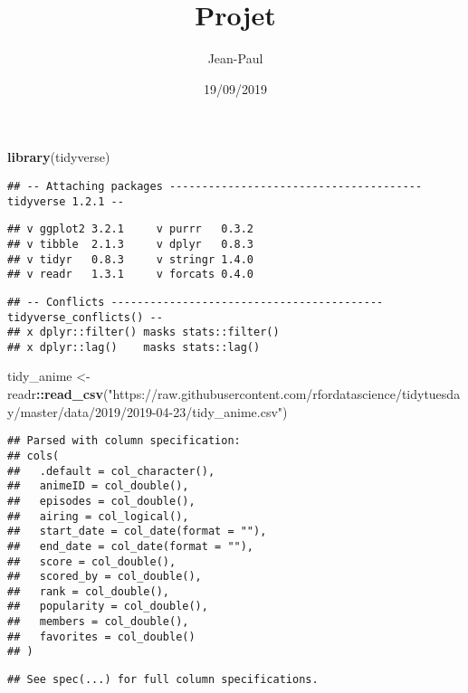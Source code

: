 \documentclass[]{article}
\title{Projet}
\author{Jean-Paul}
\date{19/09/2019}
\newenvironment{Shaded}{\begin{snugshade}}{\end{snugshade}}
\newcommand{\KeywordTok}[1]{\textcolor[rgb]{0.13,0.29,0.53}{\textbf{#1}}}
\newcommand{\NormalTok}[1]{#1}
\newcommand{\OperatorTok}[1]{\textcolor[rgb]{0.81,0.36,0.00}{\textbf{#1}}}
\newcommand{\StringTok}[1]{\textcolor[rgb]{0.31,0.60,0.02}{#1}}
\begin{document}
\maketitle

\begin{Shaded}
\begin{Highlighting}[]
\KeywordTok{library}\NormalTok{(tidyverse)}
\end{Highlighting}
\end{Shaded}

\begin{verbatim}
## -- Attaching packages --------------------------------------- tidyverse 1.2.1 --
\end{verbatim}

\begin{verbatim}
## v ggplot2 3.2.1     v purrr   0.3.2
## v tibble  2.1.3     v dplyr   0.8.3
## v tidyr   0.8.3     v stringr 1.4.0
## v readr   1.3.1     v forcats 0.4.0
\end{verbatim}

\begin{verbatim}
## -- Conflicts ------------------------------------------ tidyverse_conflicts() --
## x dplyr::filter() masks stats::filter()
## x dplyr::lag()    masks stats::lag()
\end{verbatim}

\begin{Shaded}
\begin{Highlighting}[]
\NormalTok{tidy_anime <-}\StringTok{ }\NormalTok{readr}\OperatorTok{::}\KeywordTok{read_csv}\NormalTok{(}\StringTok{"https://raw.githubusercontent.com/rfordatascience/tidytuesday/master/data/2019/2019-04-23/tidy_anime.csv"}\NormalTok{)}
\end{Highlighting}
\end{Shaded}

\begin{verbatim}
## Parsed with column specification:
## cols(
##   .default = col_character(),
##   animeID = col_double(),
##   episodes = col_double(),
##   airing = col_logical(),
##   start_date = col_date(format = ""),
##   end_date = col_date(format = ""),
##   score = col_double(),
##   scored_by = col_double(),
##   rank = col_double(),
##   popularity = col_double(),
##   members = col_double(),
##   favorites = col_double()
## )
\end{verbatim}

\begin{verbatim}
## See spec(...) for full column specifications.
\end{verbatim}
\end{document}
